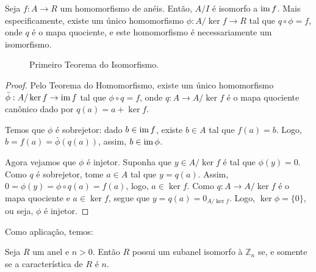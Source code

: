 \begin{theorem}
    Seja $f:A\rightarrow R$ um homomorfismo de anéis.
    Então, $A/I$ é isomorfo a $\operatorname{im} f$.
    Mais especificamente, existe um único homomorfismo $\phi:A/\ker f\rightarrow R$ tal que $q\circ \phi=f$, onde $q$ é o mapa quociente, e este homomorfismo é necessariamente um isomorfismo.
    \begin{figure}[H]\centering
        \caption{Primeiro Teorema do Isomorfismo.}
    \end{figure}
\end{theorem}

\begin{proof}
Pelo Teorema do Homomorfismo, existe um único homomorfismo $\bar \phi:A/\ker f\rightarrow \operatorname{im} f$ tal que $\phi\circ q=f$, onde $q:A\rightarrow A/\ker f$ é o mapa quociente canônico dado por $q(a)=a+\ker f$.

Temos que $\phi$ é sobrejetor: dado $b \in \operatorname{im} f$, existe $b \in A$ tal que $f(a)=b$.
Logo, $b=f(a)=\bar \phi(q(a))$, assim, $b \in \operatorname{im} \phi$.

Agora vejamos que $\phi$ é injetor.
Suponha que $y \in A/\ker f$ é tal que $\phi(y)=0$.
Como $q$ é sobrejetor, tome $a \in A$ tal que $y=q(a)$.
Assim, $0=\phi(y)=\phi\circ q(a)=f(a)$, logo, $a \in \ker f$.
Como $q:A\rightarrow A/\ker f$ é o mapa quociente e $a \in \ker f$, segue que $y=q(a)=0_{A/\ker f}$.
Logo, $\ker\phi=\{0\}$, ou seja, $\phi$ é injetor.
\end{proof}

Como aplicação, temos:

\begin{prop}
Seja $R$ um anel e $n>0$. Então $R$ possui um subanel isomorfo à $\mathbb Z_n$ se, e somente se a característica de $R$ é $n$.
\end{prop}

